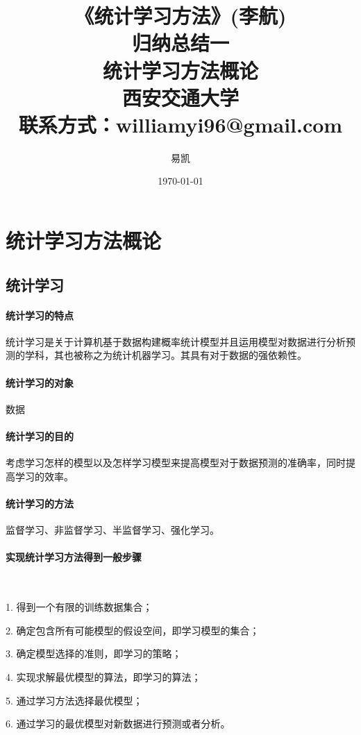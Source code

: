\documentclass[UTF8]{ctexart}
\title{\Huge{《统计学习方法》(李航)\\归纳总结一\\统计学习方法概论\\} \huge{西安交通大学 \\ 联系方式：williamyi96@gmail.com\\ }}
\author{\huge{易凯}}
\date{\Huge\today}
\begin{document}
	\maketitle
	\vspace{100mm}
	\newpage
	\tableofcontents
	\newpage

	\section{统计学习方法概论}
	\subsection{统计学习}
	\paragraph{统计学习的特点}
	统计学习是关于计算机基于数据构建概率统计模型并且运用模型对数据进行分析预测的学科，其也被称之为统计机器学习。其具有对于数据的强依赖性。

	\paragraph{统计学习的对象}
	数据

	\paragraph{统计学习的目的}
	考虑学习怎样的模型以及怎样学习模型来提高模型对于数据预测的准确率，同时提高学习的效率。

	\paragraph{统计学习的方法}
	监督学习、非监督学习、半监督学习、强化学习。

	\paragraph{实现统计学习方法得到一般步骤}

	~

	1. 得到一个有限的训练数据集合；

	2. 确定包含所有可能模型的假设空间，即学习模型的集合；

	3. 确定模型选择的准则，即学习的策略；

	4. 实现求解最优模型的算法，即学习的算法；

	5. 通过学习方法选择最优模型；

	6. 通过学习的最优模型对新数据进行预测或者分析。
\end{document}
